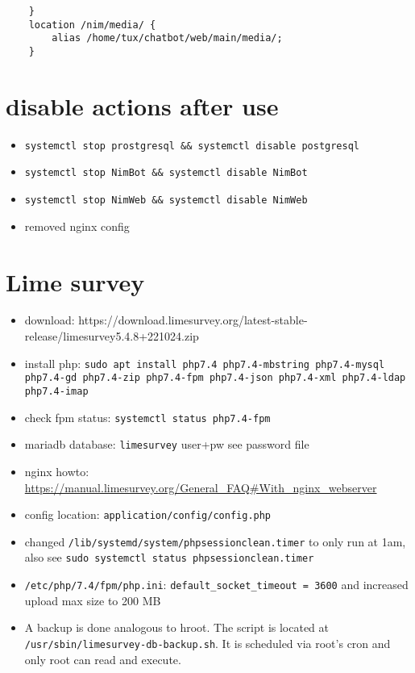 \documentclass{article}
\begin{document}
\begin{verbatim}
    }                                                                                                                                                                                                                                                         
    location /nim/media/ {                                                                                                                                                                                                                                    
        alias /home/tux/chatbot/web/main/media/;                                                                                                                                                                                                              
    }    
\end{verbatim}

\section{disable actions after use}

\begin{itemize}
    \item \verb|systemctl stop prostgresql && systemctl disable postgresql|
    \item \verb|systemctl stop NimBot && systemctl disable NimBot|
    \item \verb|systemctl stop NimWeb && systemctl disable NimWeb|
    \item removed nginx config
\end{itemize}

\section{Lime survey}
\begin{itemize}
    \item download: https://download.limesurvey.org/latest-stable-release/limesurvey5.4.8+221024.zip
    \item install php: \verb|sudo apt install php7.4 php7.4-mbstring php7.4-mysql php7.4-gd php7.4-zip php7.4-fpm php7.4-json php7.4-xml php7.4-ldap php7.4-imap|
    \item check fpm status: \verb|systemctl status php7.4-fpm|
    \item mariadb database: \verb|limesurvey| user+pw see password file
    \item nginx howto: \url{https://manual.limesurvey.org/General_FAQ#With_nginx_webserver}
    \item config location: \verb|application/config/config.php|
    \item changed \verb|/lib/systemd/system/phpsessionclean.timer| to only run at 1am, also see \verb|sudo systemctl status phpsessionclean.timer|
    \item \verb|/etc/php/7.4/fpm/php.ini|: \verb|default_socket_timeout = 3600| and increased upload max size to 200 MB 
    \item A backup is done analogous to hroot. The script is located at \verb|/usr/sbin/limesurvey-db-backup.sh|. It is scheduled via root's cron and only root can read and execute.
\end{itemize}
\end{document}

